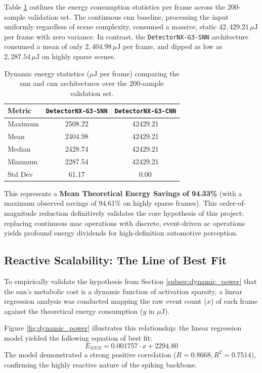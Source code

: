 Table \ref{tab:energy_statistics} outlines the energy consumption statistics per frame across the 200-sample validation set.
The continuous \gls{cnn} baseline, processing the input uniformly regardless of scene complexity, consumed a massive, static $42{,}429.21\,\mu\text{J}$ per frame with zero variance.
In contrast, the \texttt{DetectorNX-G3-SNN} architecture consumed a mean of only $2{,}404.98\,\mu\text{J}$ per frame, and dipped as low as $2{,}287.54\,\mu\text{J}$ on highly sparse scenes.

\begin{table}[htbp]
\centering
\begin{tabular}{|l|c|c|}
\hline
\textbf{Metric} & \textbf{\texttt{DetectorNX-G3-SNN}} & \textbf{\texttt{DetectorNX-G3-CNN}} \\
\hline
Maximum & 2508.22 & 42429.21 \\
Mean & 2404.98 & 42429.21 \\
Median & 2428.74 & 42429.21 \\
Minimum & 2287.54 & 42429.21 \\
Std Dev & 61.17 & 0.00 \\
\hline
\end{tabular}
\caption[Energy Statistics per Frame]{Dynamic energy statistics ($\mu\text{J}$ per frame) comparing the \gls{snn} and \gls{cnn} architectures over the 200-sample validation set.}
\label{tab:energy_statistics}
\end{table}

This represents a \textbf{Mean Theoretical Energy Savings of 94.33\%} (with a maximum observed savings of 94.61\% on highly sparse frames). 
This order-of-magnitude reduction definitively validates the core hypothesis of this project: replacing continuous \gls{mac} operations with discrete, event-driven \gls{ac} operations yields profound energy dividends for high-definition automotive perception.

\subsection*{Reactive Scalability: The Line of Best Fit}

To empirically validate the hypothesis from Section \ref{subsec:dynamic_power} that the \gls{snn}'s metabolic cost is a dynamic function of activation sparsity, a linear regression analysis was conducted mapping the raw event count ($x$) of each frame against the theoretical energy consumption ($y$ in $\mu\text{J}$).

Figure \ref{fig:dynamic_power} illustrates this relationship: the linear regression model yielded the following equation of best fit:
\begin{equation}
    E_{SNN} = 0.001757 \cdot x + 2294.80
\end{equation}
The model demonstrated a strong positive correlation ($R = 0.8668, R^2 = 0.7514$), confirming the highly reactive nature of the spiking backbone. 

